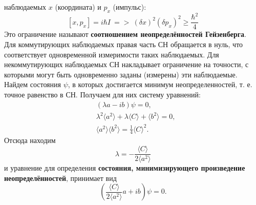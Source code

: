 наблюдаемых $x$ (координата) и $p_x$ (импульс):
$$
[x,p_x] = i\hbar I\ =>\ (\delta x)^2(\delta p_x)^2 \ge \frac{\hbar^2}{4}
$$
Это ограничение называют {\bf соотношением неопределённостей Гейзенберга}.\\
Для коммутирующих наблюдаемых правая часть СН обращается в нуль, что соответствует одновременной измеримости таких наблюдаемых.
Для некоммутирующих наблюдаемых СН накладывает ограничение на точности, с которыми могут быть одновременно заданы (измерены) эти наблюдаемые.\\
Найдем состояния $\psi$, в которых достигается минимум неопределенностей, т. е. точное равенство в СН. Получаем для них систему уравнений:
$$
\begin{aligned}
&(\lambda a - ib)\psi = 0,\\
&\lambda^2\langle a^2\rangle + \lambda \langle C\rangle + \langle b^2\rangle = 0,\\
&\langle a^2\rangle\langle b^2\rangle = \frac{1}{4}\langle C\rangle^2.
\end{aligned}
$$
Отсюда находим
$$
\lambda = -\frac{\langle C\rangle}{2\langle a^2\rangle}
$$
и уравнение для определения {\bf состояния, минимизирующего произведение неопределённостей}, принимает вид
$$
\left(\frac{\langle C\rangle}{2\langle a^2\rangle}a + ib\right)\psi = 0.
$$